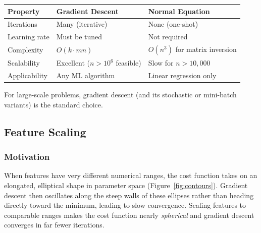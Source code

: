 \begin{center}
\begin{tabular}{lll}
\toprule
\textbf{Property} & \textbf{Gradient Descent} & \textbf{Normal Equation}\\
\midrule
Iterations        & Many (iterative) & None (one-shot)\\
Learning rate     & Must be tuned    & Not required\\
Complexity        & $O(k\cdot mn)$   & $O(n^3)$ for matrix inversion\\
Scalability       & Excellent ($n>10^6$ feasible) & Slow for $n>10{,}000$\\
Applicability     & Any ML algorithm & Linear regression only\\
\bottomrule
\end{tabular}
\end{center}

For large-scale problems, gradient descent (and its stochastic or mini-batch
variants) is the standard choice.

\subsection{Feature Scaling}
\label{sec:feat_scale}

\subsubsection{Motivation}

When features have very different numerical ranges, the cost function takes on
an elongated, elliptical shape in parameter space (Figure~\ref{fig:contours}).
Gradient descent then oscillates along the steep walls of these ellipses rather
than heading directly toward the minimum, leading to slow convergence. Scaling
features to comparable ranges makes the cost function nearly \emph{spherical}
and gradient descent converges in far fewer iterations.

